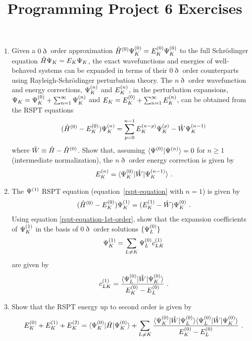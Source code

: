 \documentclass[fleqn,11pt]{article}
\title{Programming Project 6 Exercises}
\author{}
\date{}
\begin{document}
\maketitle

\begin{enumerate}
  \item
  Given a $0\eth$ order approximation $\hat{H}^{(0)}\Psi_K^{(0)}=E_K^{(0)}\Psi_K^{(0)}$ to the full Schr\"odinger equation $\hat{H}\Psi_K=E_K\Psi_K$, the exact wavefunctions and energies of well-behaved systems can be expanded in terms of their $0\eth$ order counterparts using Rayleigh-Schr\"odinger perturbation theory.
  The $n\eth$ order wavefunction and energy corrections, $\Psi_K^{(n)}$ and $E_K^{(n)}$, in the perturbation expansions, $\Psi_K=\Psi_K^{(0)}+\sum_{n=1}^{\infty}\Psi_K^{(n)}$ and $E_K=E_K^{(0)}+\sum_{n=1}^{\infty}E_K^{(n)}$, can be obtained from the RSPT equations
\begin{align}
\label{rspt-equation}
&&
  (\hat{H}^{(0)}-E_K^{(0)})\Psi^{(n)}_K
=
  \sum_{p=0}^{n-1}E^{(n-p)}_K\Psi^{(p)}_K
-
  \hat{W}\Psi^{(n-1)}_K
\end{align}
where $\hat{W}\equiv\hat{H}-\hat{H}^{(0)}$.
Show that, assuming $\langle\Psi^{(0)}|\Psi^{(n)}\rangle=0$ for $n\geq1$ (intermediate normalization), the $n\eth$ order energy correction is given by
\begin{align}
&&
  E^{(n)}_K
=
  \langle\Psi^{(0)}_K|\hat{W}|\Psi^{(n-1)}_K\rangle\ .
\end{align}


\item The $\Psi^{(1)}$ RSPT equation (equation~\ref{rspt-equation} with $n=1$) is given by
\begin{align}
\label{rspt-equation-1st-order}
&&
  (\hat{H}^{(0)}-E_K^{(0)})\Psi_K^{(1)}
=
  (E_K^{(1)}-\hat{W})\Psi_K^{(0)}\ .
\end{align}
Using equation \ref{rspt-equation-1st-order}, show that the expansion coefficients of $\Psi_K^{(1)}$ in the basis of $0\eth$ order solutions $\{\Psi_L^{(0)}\}$
\begin{align*}
&&
  \Psi_K^{(1)}
=
  \sum_{L\neq K}
  \Psi_L^{(0)} c_{LK}^{(1)}
\end{align*}
are given by
\begin{align}
&&
  c_{LK}^{(1)}
=
  \dfrac{\langle\Psi_L^{(0)}|\hat{W}|\Psi_K^{(0)}\rangle}{E_K^{(0)}-E_L^{(0)}}\ .
\end{align}

\item Show that the RSPT energy up to second order is given by
\begin{align}
&&
  E_K\ord{0}
+
  E_K\ord{1}
+
  E_K\ord{2}
=
  \ip{\Y_K\ord{0}|\op{H}|\Y_K\ord{0}}
+
  \sum_{L\neq K}
  \fr{\ip{\Y_K\ord{0}|\op{W}|\Y_L\ord{0}}\ip{\Y_L\ord{0}|\op{W}|\Y_K\ord{0}}}{E_K\ord{0}-E_L\ord{0}}\ .
\end{align}



\end{enumerate}
\end{document}
